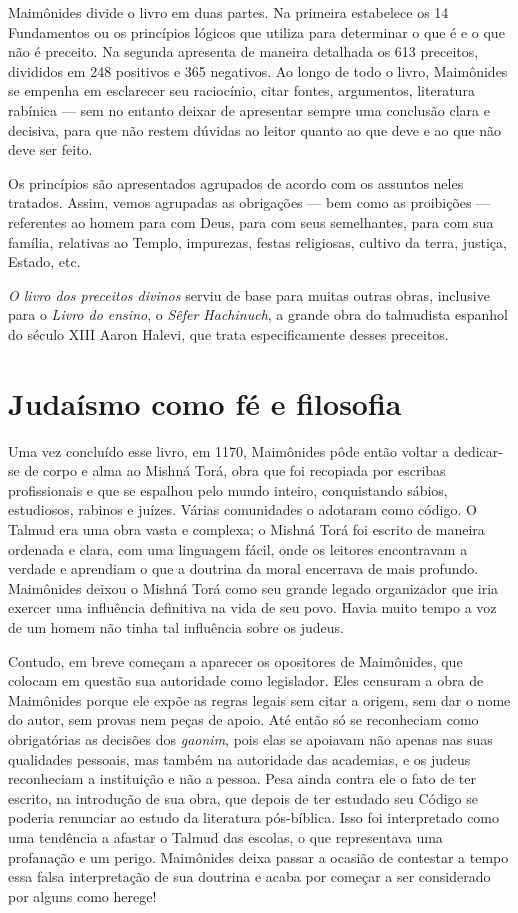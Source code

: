 Maimônides divide o livro em duas partes. Na primeira estabelece os
14 Fundamentos ou os princípios lógicos que utiliza para determinar o
que é e o que não é preceito. Na segunda apresenta de maneira
detalhada os 613 preceitos, divididos em 248 positivos e 365 negativos.
Ao longo de todo o livro, Maimônides se empenha em esclarecer seu
raciocínio, citar fontes, argumentos, literatura rabínica --- sem no
entanto deixar de apresentar sempre uma conclusão clara e decisiva,
para que não restem dúvidas ao leitor quanto ao que deve e ao que não
deve ser feito.

Os princípios são apresentados agrupados de acordo com os assuntos neles tratados. 
Assim, vemos agrupadas as obrigações ---
bem como as proibições --- referentes ao homem para com Deus, para com
seus semelhantes, para com sua família, relativas ao Templo, 
impurezas, festas religiosas, cultivo da terra, justiça, Estado, etc.

\emph{O livro dos preceitos divinos} serviu de base para muitas outras
obras, inclusive para o \emph{Livro do ensino}, o \emph{Sêfer Hachinuch}, a
grande obra do talmudista espanhol do século XIII Aaron Halevi, que
trata especificamente desses preceitos.

\section{Judaísmo como fé e filosofia}

Uma vez concluído esse livro, em 1170, Maimônides pôde então voltar a
dedicar-se de corpo e alma ao Mishná Torá, obra que foi
recopiada por escribas profissionais e que se espalhou pelo mundo
inteiro, conquistando sábios, estudiosos, rabinos e juízes. Várias
comunidades o adotaram como código. O Talmud era uma obra vasta
e complexa; o Mishná Torá foi escrito de maneira ordenada e
clara, com uma linguagem fácil, onde os leitores encontravam a verdade
e aprendiam o que a doutrina da moral encerrava de mais profundo.
Maimônides deixou o Mishná Torá como seu grande legado
organizador que iria exercer uma influência definitiva na vida de seu
povo. Havia muito tempo a voz de um homem não tinha tal influência sobre
os judeus.

Contudo, em breve começam a aparecer os opositores de Maimônides, que
colocam em questão sua autoridade como legislador. Eles censuram a obra
de Maimônides porque ele expõe as regras legais sem citar a origem, sem
dar o nome do autor, sem provas nem peças de apoio. Até então só se
reconheciam como obrigatórias as decisões dos \emph{gaonim}, pois elas se
apoiavam não apenas nas suas qualidades pessoais, mas também na
autoridade das academias, e os judeus reconheciam a instituição e não a
pessoa. Pesa ainda contra ele o fato de ter escrito, na introdução de
sua obra, que depois de ter estudado seu Código se poderia renunciar ao
estudo da literatura pós-bíblica. Isso foi interpretado como uma
tendência a afastar o Talmud das escolas, o que representava uma
profanação e um perigo. Maimônides deixa passar a ocasião de contestar a
tempo essa falsa interpretação de sua doutrina e acaba por começar a
ser considerado por alguns como herege!

